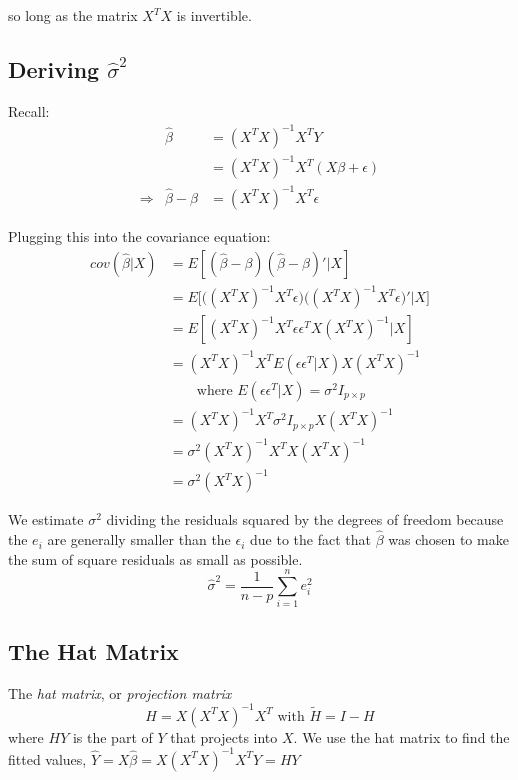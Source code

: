 \documentclass[12pt]{article}
\begin{document}
so long as the matrix $X^{T}X$ is invertible.

\subsection{Deriving $\hat{\sigma}^{2}$}

Recall:
\doublespacing
\[ \begin{array}{rrl} & \hat{\beta} &= (X^{T}X)^{-1}X^{T}Y \nonumber \\
& &= (X^{T}X)^{-1}X^{T}(X\beta + \epsilon) \\
\Rightarrow & \hat{\beta} - \beta &= (X^{T}X)^{-1}X^{T} \epsilon
\end{array} \]
\singlespacing


Plugging this into the covariance equation:
\doublespacing
\[ \begin{array}{rl}
cov(\hat{\beta} | X) &= E[(\hat{\beta} - \beta)(\hat{\beta} - \beta)'|X] \\
 &= E\big[ \big((X^{T}X)^{-1}X^{T}\epsilon \big) \big((X^{T}X)^{-1}X^{T}\epsilon)' | X\big] \\
 &= E[ (X^{T}X)^{-1}X^{T} \epsilon \epsilon^{T}X(X^{T}X)^{-1} | X] \\
 &= (X^{T}X)^{-1}X^{T} E(\epsilon\epsilon^{T} | X) X(X^{T}X)^{-1}  \\
 &\qquad \text{where } E(\epsilon\epsilon^{T} | X) = \sigma^{2} I_{p \times p} \\
 &= (X^{T}X)^{-1}X^{T} \sigma^{2} I_{p \times p} X(X^{T}X)^{-1} \\
&= \sigma^{2} (X^{T}X)^{-1}X^{T}X(X^{T}X)^{-1} \\
&= \sigma^{2} (X^{T}X)^{-1}
\end{array} \]
\singlespacing

We estimate $\sigma^2$ dividing the residuals squared by the degrees of freedom because the $e_{i}$ are generally smaller than the $\epsilon_{i}$ due to the fact that $\hat{\beta}$ was chosen to make the sum of square residuals as small as possible.
\[ \hat{\sigma}^2 = \frac{1}{n-p}\sum_{i = 1}^{n} e_{i}^2 \]

\subsection{The Hat Matrix}
The \emph{hat matrix}, or \emph{projection matrix}
\[ H = X(X^{T}X)^{-1}X^{T} \text{ with } \tilde{H} = I - H \]
where $HY$ is the part of $Y$ that projects into $X$.  We use the hat matrix to find the fitted values, $\hat{Y} = X\hat{\beta} = X(X^{T}X)^{-1}X^{T}Y = HY$
\end{document}
